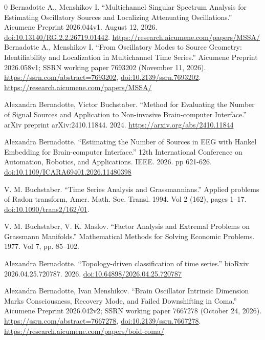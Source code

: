 \documentclass{article}
\begin{document}
\renewcommand{\refname}{REFERENCES}
 \begin{thebibliography}{0}
 Bernadotte A., Menshikov I. ``Multichannel Singular Spectrum Analysis for Estimating Oscillatory Sources and Localizing Attenuating Oscillations.'' Aicumene Preprint 2026.044v1. August 12, 2026. \href{https://doi.org/10.13140/RG.2.2.26719.01442}{doi:10.13140/RG.2.2.26719.01442}. \url{https://research.aicumene.com/papers/MSSA/}
 Bernadotte A., Menshikov I. ``From Oscillatory Modes to Source Geometry: Identifiability and Localization in Multichannel Time Series.'' Aicumene Preprint 2026.058v1; SSRN working paper 7693202 (November 11, 2026). \url{https://ssrn.com/abstract=7693202}, \href{https://doi.org/10.2139/ssrn.7693202}{doi:10.2139/ssrn.7693202}. \url{https://research.aicumene.com/papers/MSSA/}


 Alexandra Bernadotte, Victor Buchstaber. ``Method for Evaluating the Number of Signal Sources and Application to Non-invasive Brain-computer Interface.'' arXiv preprint arXiv:2410.11844. 2024. \url{https://arxiv.org/abs/2410.11844}

 Alexandra Bernadotte. ``Estimating the Number of Sources in EEG with Hankel Embedding for Brain-computer Interface.'' 12th International Conference on Automation, Robotics, and Applications. IEEE. 2026. pp 621-626. \href{https://doi.org/10.1109/ICARA69401.2026.11480398}{doi:10.1109/ICARA69401.2026.11480398}

 V. M. Buchstaber. ``Time Series Analysis and Grassmannians.''  Applied problems of Radon transform, Amer. Math. Soc. Transl. 1994. Vol 2 (162), pages 1--17. \href{https://doi.org/10.1090/trans2/162/01}{doi:10.1090/trans2/162/01}.

 V. M. Buchstaber, V. K. Maslov. ``Factor Analysis and Extremal Problems on Grassmann Manifolds.'' Mathematical Methods for Solving Economic Problems. 1977. Vol 7, pp. 85--102.

 Alexandra Bernadotte.  ``Topology-driven classification of time series.'' bioRxiv 2026.04.25.720787. 2026. \href{https://doi.org/10.64898/2026.04.25.720787}{doi:10.64898/2026.04.25.720787}

 Alexandra Bernadotte, Ivan Menshikov. ``Brain Oscillator Intrinsic Dimension Marks Consciousness, Recovery Mode, and Failed Downshifting in Coma.'' Aicumene Preprint 2026.042v2; SSRN working paper 7667278 (October 24, 2026). \url{https://ssrn.com/abstract=7667278}, \href{https://doi.org/10.2139/ssrn.7667278}{doi:10.2139/ssrn.7667278}. \url{https://research.aicumene.com/papers/boid-coma/}


\end{thebibliography}
\end{document}
